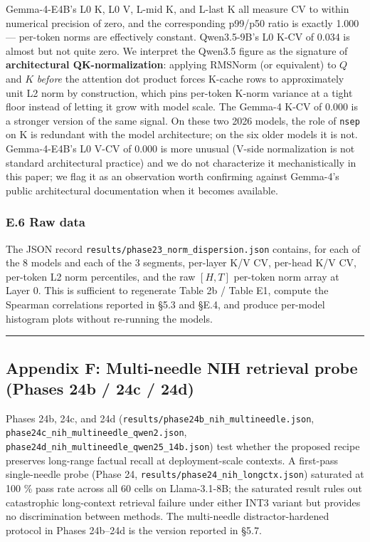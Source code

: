 Gemma-4-E4B's L0 K, L0 V, L-mid K, and L-last K all measure CV to within
numerical precision of zero, and the corresponding p99/p50 ratio is
exactly 1.000 --- per-token norms are effectively constant. Qwen3.5-9B's
L0 K-CV of 0.034 is almost but not quite zero. We interpret the Qwen3.5
figure as the signature of \textbf{architectural QK-normalization}:
applying RMSNorm (or equivalent) to \(Q\) and \(K\) \emph{before} the
attention dot product forces K-cache rows to approximately unit L2 norm
by construction, which pins per-token K-norm variance at a tight floor
instead of letting it grow with model scale. The Gemma-4 K-CV of 0.000
is a stronger version of the same signal. On these two 2026 models, the
role of \texttt{nsep} on K is redundant with the model architecture; on
the six older models it is not. Gemma-4-E4B's L0 V-CV of 0.000 is more
unusual (V-side normalization is not standard architectural practice)
and we do not characterize it mechanistically in this paper; we flag it
as an observation worth confirming against Gemma-4's public
architectural documentation when it becomes available.

\subsubsection{E.6 Raw data}\label{e.6-raw-data}

The JSON record \texttt{results/phase23\_norm\_dispersion.json}
contains, for each of the 8 models and each of the 3 segments, per-layer
K/V CV, per-head K/V CV, per-token L2 norm percentiles, and the raw
\([H, T]\) per-token norm array at Layer 0. This is sufficient to
regenerate Table 2b / Table E1, compute the Spearman correlations
reported in §5.3 and §E.4, and produce per-model histogram plots without
re-running the models.

\begin{center}\rule{0.5\linewidth}{0.5pt}\end{center}

\subsection{Appendix F: Multi-needle NIH retrieval probe (Phases 24b /
24c /
24d)}\label{appendix-f-multi-needle-nih-retrieval-probe-phases-24b-24c-24d}

Phases 24b, 24c, and 24d
(\texttt{results/phase24b\_nih\_multineedle.json},
\texttt{phase24c\_nih\_multineedle\_qwen2.json},
\texttt{phase24d\_nih\_multineedle\_qwen25\_14b.json}) test whether the
proposed recipe preserves long-range factual recall at deployment-scale
contexts. A first-pass single-needle probe (Phase 24,
\texttt{results/phase24\_nih\_longctx.json}) saturated at 100 \% pass
rate across all 60 cells on Llama-3.1-8B; the saturated result rules out
catastrophic long-context retrieval failure under either INT3 variant
but provides no discrimination between methods. The multi-needle
distractor-hardened protocol in Phases 24b--24d is the version reported
in §5.7.

